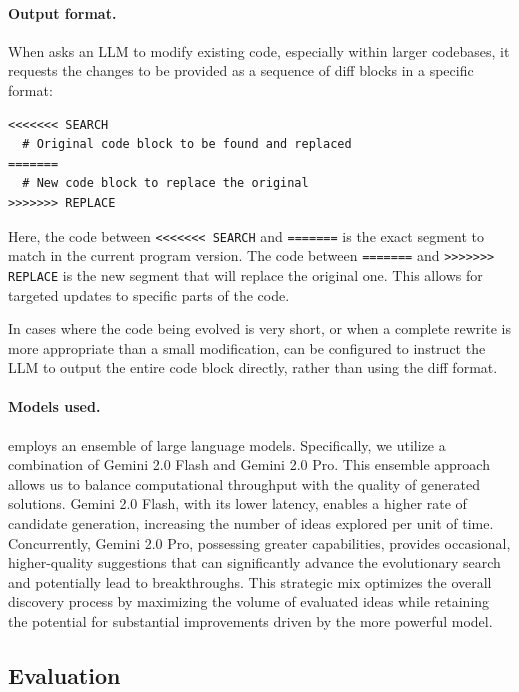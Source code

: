 \paragraph{Output format.}
When \method asks an LLM to modify existing code, especially within larger codebases, it requests the changes to be provided as a sequence of diff blocks in a specific format:

\begin{verbatim}
<<<<<<< SEARCH
  # Original code block to be found and replaced
=======
  # New code block to replace the original
>>>>>>> REPLACE
\end{verbatim}

Here, the code between \texttt{<{}<{}<{}<{}<{}<{}< SEARCH} and \texttt{=======} is the exact segment to match in the current program version. The code between \texttt{=======} and \texttt{>{}>{}>{}>{}>{}>{}> REPLACE} is the new segment that will replace the original one.
This allows for targeted updates to specific parts of the code.

In cases where the code being evolved is very short, or when a complete rewrite is more appropriate than a small modification, \method can be configured to instruct the LLM to output the entire code block directly, rather than using the diff format. 

\paragraph{Models used.}
\method employs an ensemble of large language models. Specifically, we utilize a combination of Gemini 2.0 Flash and Gemini 2.0 Pro.
This ensemble approach allows us to balance computational throughput with the quality of generated solutions.
Gemini 2.0 Flash, with its lower latency, enables a higher rate of candidate generation, increasing the number of ideas explored per unit of time.
Concurrently, Gemini 2.0 Pro, possessing greater capabilities, provides occasional, higher-quality suggestions that can significantly advance the evolutionary search and potentially lead to breakthroughs.
This strategic mix optimizes the overall discovery process by maximizing the volume of evaluated ideas while retaining the potential for substantial improvements driven by the more powerful model.


\subsection{Evaluation}
\label{subsec:evaluation}

